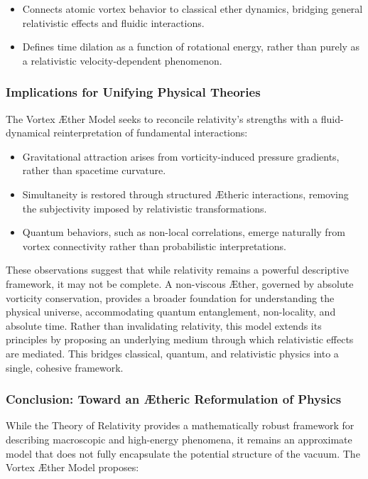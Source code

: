 \begin{itemize}
    \item Connects atomic vortex behavior to classical ether dynamics, bridging general relativistic effects and fluidic interactions.
    \item Defines time dilation as a function of rotational energy, rather than purely as a relativistic velocity-dependent phenomenon.
\end{itemize}
\subsubsection*{Implications for Unifying Physical Theories}
The Vortex Æther Model seeks to reconcile relativity’s strengths with a fluid-dynamical reinterpretation of fundamental interactions:

\begin{itemize}
    \item Gravitational attraction arises from vorticity-induced pressure gradients, rather than spacetime curvature.
    \item Simultaneity is restored through structured Ætheric interactions, removing the subjectivity imposed by relativistic transformations.
    \item Quantum behaviors, such as non-local correlations, emerge naturally from vortex connectivity rather than probabilistic interpretations.
\end{itemize}
These observations suggest that while relativity remains a powerful descriptive framework, it may not be complete. A non-viscous Æther, governed by absolute vorticity conservation, provides a broader foundation for understanding the physical universe, accommodating quantum entanglement, non-locality, and absolute time.
Rather than invalidating relativity, this model extends its principles by proposing an underlying medium through which relativistic effects are mediated.
This bridges classical, quantum, and relativistic physics into a single, cohesive framework.

\subsubsection*{Conclusion: Toward an Ætheric Reformulation of Physics}
While the Theory of Relativity provides a mathematically robust framework for describing macroscopic and high-energy phenomena, it remains an approximate model that does not fully encapsulate the potential structure of the vacuum.
The Vortex Æther Model proposes:

